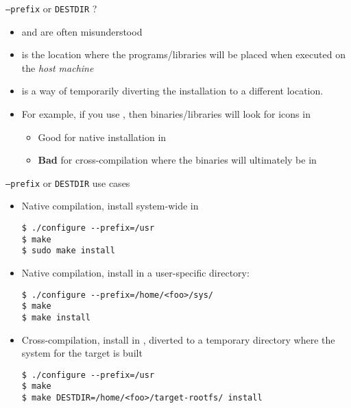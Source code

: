 \begin{frame}{{\tt --prefix} or {\tt DESTDIR} ?}
  \begin{itemize}
  \item {} and  are often misunderstood
  \item {} is the location where the programs/libraries
    will be placed when executed on the {\em host machine}
  \item {} is a way of temporarily diverting the
    installation to a different location.

  \item For example, if you use ,
    then binaries/libraries will look for icons in
    \begin{itemize}
    \item Good for native installation in 
    \item {\bf Bad} for cross-compilation where the binaries will
      ultimately be in 
    \end{itemize}

  \end{itemize}
\end{frame}

\begin{frame}[fragile]{{\tt --prefix} or {\tt DESTDIR} use cases}
  \begin{itemize}
  \item Native compilation, install system-wide in 
    \begin{block}{}
{\tiny
\begin{verbatim}
$ ./configure --prefix=/usr
$ make
$ sudo make install
\end{verbatim}}
\end{block}
\item Native compilation, install in a user-specific directory:
  \begin{block}{}
{\tiny
\begin{verbatim}
$ ./configure --prefix=/home/<foo>/sys/
$ make
$ make install
\end{verbatim}}
\end{block}
\item Cross-compilation, install in , diverted to a
  temporary directory where the system for the target is built
  \begin{block}{}
{\tiny
\begin{verbatim}
$ ./configure --prefix=/usr
$ make
$ make DESTDIR=/home/<foo>/target-rootfs/ install
\end{verbatim}}
\end{block}

\end{itemize}

\end{frame}

